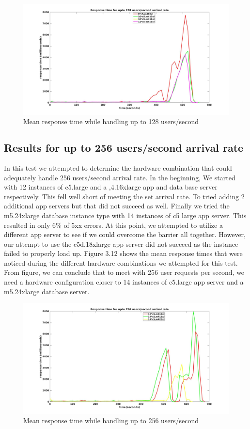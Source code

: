 \begin{figure}[h]
	\centering
	\includegraphics[width=1\textwidth, height=0.5\textheight ]{images/scale128.jpg}
	\caption{Mean response time while handling up to 128 users/second}\label{fig:sqlopt}
\end{figure}



\subsection{Results for up to 256 users/second arrival rate}
In this test we attempted to determine the hardware combination that could adequately handle 256 users/second arrival rate. In the beginning, We started with 12 instances of c5.large and a ,4.16xlarge app and data base server respectively. This fell well short of meeting the set arrival rate. To tried adding 2 additional app servers but that did not succeed as well. Finally we tried the m5.24xlarge database instance type with 14 instances of c5 large app server. This resulted in only $6\%$ of 5xx errors. At this point, we attempted to utilize a different app server to see if we could overcome the barrier all together. However, our attempt to use the c5d.18xlarge app server did not succeed as the instance failed to properly load up. Figure 3.12 shows the mean response times that were noticed during the different hardware combinations we attempted for this test. From figure, we can conclude that to meet with 256 user requests per second, we need a hardware configuration closer to 14 instances of c5.large app server and a m5.24xlarge database server.

\begin{figure}[h]
	\centering
	\includegraphics[width=1\textwidth]{images/scale256.jpg}
	\caption{Mean response time while handling up to 256 users/second}\label{fig:sqlopt}
\end{figure}


